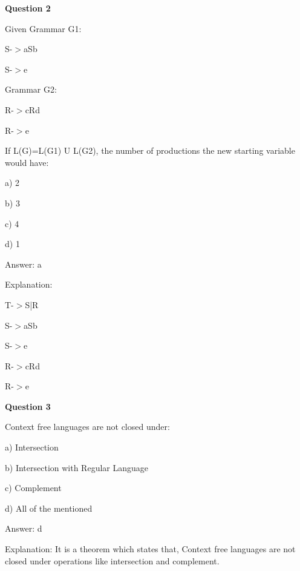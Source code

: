 \documentclass{article}
\begin{document}
\begin{mdframed}[linewidth=1pt, roundcorner=5pt, linecolor=gray!30, backgroundcolor=gray!5]
\textbf{Question 2} 

Given Grammar G1:

S-$>$aSb

S-$>$e

Grammar G2:

R-$>$cRd

R-$>$e

If L(G)=L(G1) U L(G2), the number of productions the new starting variable would have:

a) 2

b) 3

c) 4

d) 1
\vspace{5pt} \par
\begin{tcolorbox}[colback=green!5, colframe=green!40!black, title=Solution]
Answer: a

Explanation:

T-$>$S|R

S-$>$aSb

S-$>$e

R-$>$cRd

R-$>$e
\end{tcolorbox}
\end{mdframed}

\begin{mdframed}[linewidth=1pt, roundcorner=5pt, linecolor=gray!30, backgroundcolor=gray!5]
\textbf{Question 3} 

Context free languages are not closed under:

a) Intersection

b) Intersection with Regular Language

c) Complement

d) All of the mentioned
\vspace{5pt} \par
\begin{tcolorbox}[colback=green!5, colframe=green!40!black, title=Solution]
Answer: d

Explanation: It is a theorem which states that, Context free languages are not closed under operations like intersection and complement.
\end{tcolorbox}
\end{mdframed}
\newpage
\end{document}
